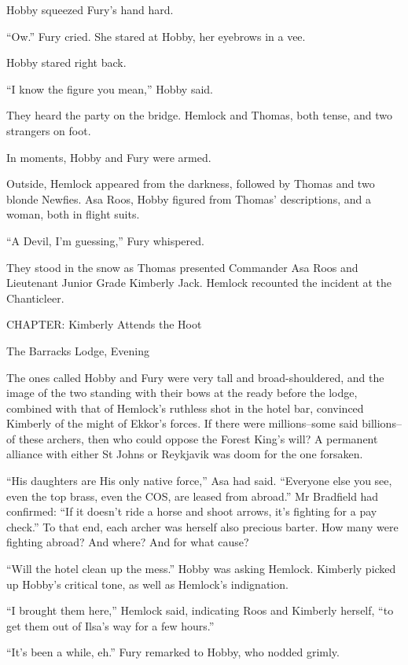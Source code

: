 \documentclass[11pt,a5paper]{article}
\begin{document}
Hobby squeezed Fury's hand hard.

``Ow.'' Fury cried. She stared at Hobby, her eyebrows in a vee.

Hobby stared right back.

``I know the figure you mean,'' Hobby said.

They heard the party on the bridge. Hemlock and Thomas, both tense, and two strangers on foot.

In moments, Hobby and Fury were armed.



Outside, Hemlock appeared from the darkness, followed by Thomas and two blonde Newfies. Asa Roos, Hobby figured from Thomas' descriptions, and a woman, both in flight suits.

``A Devil, I'm guessing,'' Fury whispered.

They stood in the snow as Thomas presented Commander Asa Roos and Lieutenant Junior Grade Kimberly Jack. Hemlock recounted the incident at the Chanticleer.



CHAPTER: Kimberly Attends the Hoot

The Barracks Lodge, Evening



The ones called Hobby and Fury were very tall and broad-shouldered, and the image of the two standing with their bows at the ready before the lodge, combined with that of Hemlock's ruthless shot in the hotel bar, convinced Kimberly of the might of Ekkor's forces. If there were millions--some said billions--of these archers, then who could oppose the Forest King's will? A permanent alliance with either St Johns or Reykjavik was doom for the one forsaken.

``His daughters are His only native force,'' Asa had said. ``Everyone else you see, even the top brass, even the COS, are leased from abroad.'' Mr Bradfield had confirmed: ``If it doesn't ride a horse and shoot arrows, it's fighting for a pay check.'' To that end, each archer was herself also precious barter. How many were fighting abroad? And where? And for what cause?

``Will the hotel clean up the mess.'' Hobby was asking Hemlock. Kimberly picked up Hobby's critical tone, as well as Hemlock's indignation.

``I brought them here,'' Hemlock said, indicating Roos and Kimberly herself, ``to get them out of Ilsa's way for a few hours.''

``It's been a while, eh.'' Fury remarked to Hobby, who nodded grimly.
\end{document}
